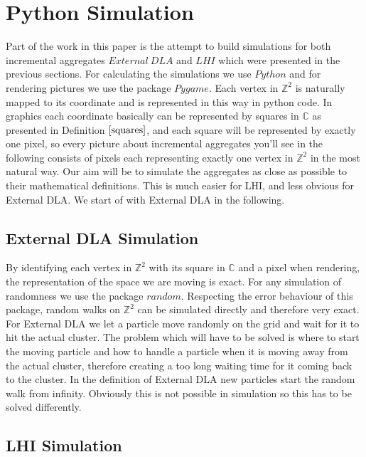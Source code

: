\documentclass[12pt,a4paper]{scrartcl}
\numberwithin{equation}{subsection}
\newcommand{\C}{\mathbb{C}} %
\newcommand{\Z}{\mathbb{Z}} %
\newcommand{\1}{\mathbbm{1}}
\numberwithin{equation}{section}
\theoremstyle{definition}
\begin{document}
\section{Python Simulation}
Part of the work in this paper is the attempt to build simulations for both incremental aggregates $\mathit{External\ DLA}$ and $\mathit{LHI}$ which were presented in the previous sections. For calculating the simulations we use $\mathit{Python}$ and for rendering pictures we use the package $\mathit{Pygame}$. Each vertex in $\Z^2$ is naturally mapped to its coordinate and is represented in this way in python code. In graphics each coordinate basically can be represented by squares in $\C$ as presented in Definition $\ref{squares}$, and each square will be represented by exactly one pixel, so every picture about incremental aggregates you'll see in the following consists of pixels each representing exactly one vertex in $\Z^2$ in the most natural way. Our aim will be to simulate the aggregates as close as possible to their mathematical definitions. This is much easier for LHI, and less obvious for External DLA. We start of with External DLA in the following.

\subsection{External DLA Simulation}

By identifying each vertex in $\Z^2$ with its square in $\C$ and a pixel when rendering, the representation of the space we are moving is exact. For any simulation of randomness we use the package $\mathit{random}$. Respecting the error behaviour of this package, random walks on $\Z^2$ can be simulated directly and therefore very exact. For External DLA we let a particle move randomly on the grid and wait for it to hit the actual cluster. The problem which will have to be solved is where to start the moving particle and how to handle a particle when it is moving away from the actual cluster, therefore creating a too long waiting time for it coming back to the cluster. In the definition of External DLA new particles start the random walk from infinity. Obviously this is not possible in simulation so this has to be solved differently. 



\subsection{LHI Simulation}
\end{document}
